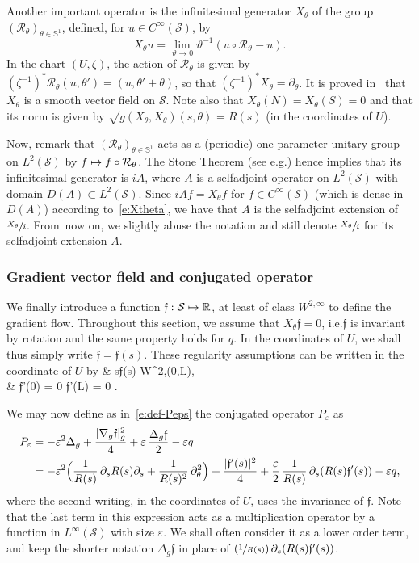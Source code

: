\documentclass[10pt]{amsart}
\newcommand\mto{\mathchoice{\longmapsto}{\mapsto}{\mapsto}{\mapsto}}
\newcommand{\Psfrac}[2]{(\sfrac{#1}{#2})}
\theoremstyle{definition}
\newcommand{\calR}{\ensuremath{\mathcal R}}
\newcommand{\calS}{\ensuremath{\mathcal S}}
\newcommand{\mb}[1]{\ensuremath{\mathbb{#1}}}
\newcommand{\R}{{\mb{R}}}
\newcommand{\bS}{\ensuremath{\mathbb S}}
\newcommand{\f}{\ensuremath{\mathfrak{f}}}
\def\baln#1\naln{\begin{align}#1\end{align}}
\newcommand\Lap{\Delta_{g}}
\newcommand\nablag{\nabla_{g}}
\let\d\partial
\let\eps\varepsilon
\let\q q
\providecommand{\eg}{e.g.}\providecommand{\ie}{i.e.}\providecommand{\etc}{etc.}
\begin{document}
Another important operator is the infinitesimal generator $X_\theta$ of the group $(\calR_\theta)_{\theta \in \bS^1}$, defined, for $u \in C^\infty(\calS)$, by
\begin{equation}
\label{e:Xtheta}
X_\theta u = \lim_{\vartheta \to 0} \vartheta^{-1} (u \circ \calR_\vartheta -u).
\end{equation}
In the chart $(U, \zeta)$, the action of $\calR_\theta$ is given by $(\zeta^{-1})^* \calR_\theta (u, \theta') = (u, \theta' +\theta)$, so that $(\zeta^{-1})^* X_\theta = \d_\theta$.
It is proved in~\cite[\S 3.2]{LL:18} that $X_\theta$ is a smooth vector field on $\calS$.
Note also that $X_\theta(N) = X_\theta(S)=0$ and that its norm is given by $\sqrt{g(X_\theta, X_\theta) (s, \theta)}= R(s)$ (in the coordinates of $U$).

Now, remark that $(\calR_\theta)_{\theta \in \bS^1}$ acts as a (periodic) one-parameter unitary group on $L^2(\calS)$ by $f \mto f\circ \calR_\theta$. The Stone Theorem (see \eg \cite[Th.\,VIII-8, p.\,266]{RS:I}) hence implies that its infinitesimal generator is $i A$, where $A$ is a selfadjoint operator on $L^2(\calS)$ with domain $D(A) \subset L^2(\calS)$. Since $i Af = X_\theta f$ for $f \in C^\infty(\calS)$ (which is dense in $D(A)$) according to~\eqref{e:Xtheta}, we have that $A$ is the selfadjoint extension of $\sfrac{X_\theta}{i}$. From~now on, we slightly abuse the notation and still denote $\sfrac{X_\theta}{i}$ for its selfadjoint extension $A$.

\subsubsection*{Gradient vector field and conjugated operator}
We finally introduce a function $\f : \calS \mto \R$, at least of class $W^{2,\infty}$ to define the gradient flow. Throughout this section, we assume that $X_\theta \f = 0$, \ie $\f$ is invariant by rotation and the same property holds for $q$. In the coordinates of $U$, we shall thus simply write $\f=\f(s)$. These regularity assumptions can be written in the coordinate of $U$ by
\baln
\label{e:reg-f}
& s\mto \f(s) \in W^{2,\infty}(0,L),  \nonumber\\
& \f'(0) = 0  \quad
{} \f'(L) = 0 .
\naln

We may now define as in~\eqref{e:def-Peps} the conjugated operator $P_\eps$ as
\begin{align}
\label{e:defPeps}
P_\eps & = - \eps^2 \Lap + \frac{|\nablag \f|_g^2}{4} + \eps\, \frac{\Lap \f}{2} -\eps \q\nonumber \\
& = - \eps^2 \Bigl( \frac{1}{R(s)}\, \d_s R(s) \d_s + \frac{1}{R(s)^2}\, \d_\theta^2 \Bigr) + \frac{|\f'(s)|^2}{4} + \frac{\eps}{2}\, \frac{1}{R(s)}\, \d_s (R(s)\f'(s)) -\eps \q,
\end{align}
where the second writing, in the coordinates of $U$, uses the invariance of $\f$. Note that the last term in this expression acts as a multiplication operator by a function in $L^\infty(\calS)$ with size $\eps$. We shall often consider it as a lower order term, and keep the shorter notation $\Lap \f$ in place of $\Psfrac{1}{R(s)}\, \d_s (R(s)\f'(s))$.
\end{document}
